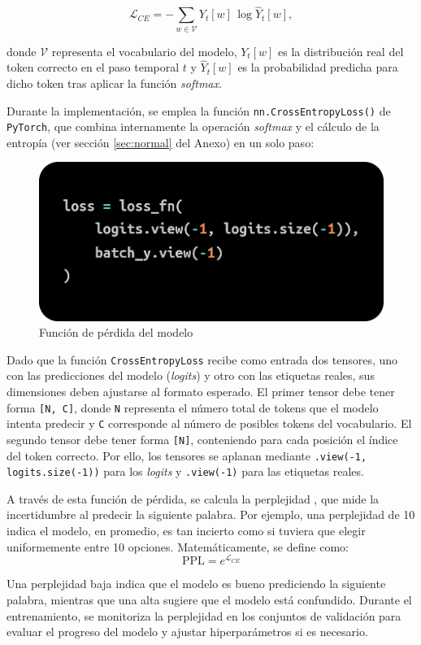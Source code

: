 \documentclass[11pt]{book}
\begin{document}
\[
\mathcal{L}_{CE} = - \sum_{w \in \mathcal{V}} Y_t[w] \, \log \hat{Y}_t[w],
\]

donde $\mathcal{V}$ representa el vocabulario del modelo, $Y_t[w]$ es la distribución real del token correcto en el paso temporal $t$ y $\hat{Y}_t[w]$ es la probabilidad predicha para dicho token tras aplicar la función \textit{softmax}.

Durante la implementación, se emplea la función \texttt{nn.CrossEntropyLoss()} de \texttt{PyTorch}, que combina internamente la operación \textit{softmax} y el cálculo de la entropía (ver sección \ref{sec:normal} del Anexo) en un solo paso:

\begin{figure}[h]
    \centering
    \includegraphics[width=0.5\linewidth]{img/cross_entropy.png}
    \caption{Función de pérdida del modelo \parencite{geeksforgeeks_crossentropy}}
    \label{fig:placeholder20}
\end{figure}

Dado que la función \texttt{CrossEntropyLoss} recibe como entrada dos tensores, uno con las predicciones del modelo (\textit{logits}) y otro con las etiquetas reales, sus dimensiones deben ajustarse al formato esperado. El primer tensor debe tener forma \texttt{[N, C]}, donde \texttt{N} representa el número total de tokens que el modelo intenta predecir y \texttt{C} corresponde al número de posibles tokens del vocabulario. El segundo tensor debe tener forma \texttt{[N]}, conteniendo para cada posición el índice del token correcto. Por ello, los tensores se aplanan mediante \texttt{.view(-1, logits.size(-1))} para los \textit{logits} y \texttt{.view(-1)} para las etiquetas reales.

A través de esta función de pérdida, se calcula la perplejidad \parencite{keerthanams2025evaluating}, que mide la incertidumbre al predecir la siguiente palabra. Por ejemplo, una perplejidad de 10 indica el modelo, en promedio, es tan incierto como si tuviera que elegir uniformemente entre 10 opciones. Matemáticamente, se define como:
\[
\text{PPL} = e^{\mathcal{L}_{CE}}
\]

Una perplejidad baja indica que el modelo es bueno prediciendo la siguiente palabra, mientras que una alta sugiere que el modelo está confundido. Durante el entrenamiento, se monitoriza la perplejidad en los conjuntos de validación para evaluar el progreso del modelo y ajustar hiperparámetros si es necesario.
\end{document}
